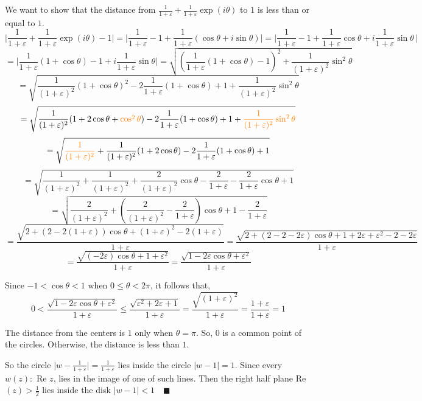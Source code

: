 \documentclass{article}
\begin{document}
We want to show that the distance from $\frac{1}{1+\varepsilon} + \frac{1}{1+\varepsilon} \exp
(i\theta)$ to $1$ is less than  or equal to $1$.
\[\bigg|\frac{1}{1+\varepsilon} + \frac{1}{1+\varepsilon} \exp
  (i\theta) -1 \bigg| = \bigg|\frac{1}{1+\varepsilon} -1 +
  \frac{1}{1+\varepsilon} (\cos \theta +i\sin \theta)\bigg| = \bigg|\frac{1}{1+\varepsilon} -1 +
  \frac{1}{1+\varepsilon} \cos \theta +i\frac{1}{1+\varepsilon} \sin
  \theta\,\bigg| \]
\[= \bigg|\frac{1}{1+\varepsilon}(1+\cos \theta) -1
  +i\frac{1}{1+\varepsilon} \sin \theta\bigg| = \sqrt{\left(\frac{1}{1+\varepsilon}(1+\cos \theta) -1\right)^2
  +\frac{1}{(1+\varepsilon)^2}\sin^2\theta}\]
\[= \sqrt{\frac{1}{(1+\varepsilon)^2}(1+\cos \theta)^2 -2\frac{1}{1+\varepsilon}(1+\cos \theta)+1
    +\frac{1}{(1+\varepsilon)^2}\sin^2\theta}\]
\[= \sqrt{\frac{1}{(1+\varepsilon)^2}(1+2\cos \theta + {\color{orange}
      \cos^2\theta}) -2\frac{1}{1+\varepsilon}(1+\cos \theta)+1
    +{\color{orange}\frac{1}{(1+\varepsilon)^2}\sin^2\theta}}\]
\[= \sqrt{{\color{orange}\frac{1}{(1+\varepsilon)^2}} + \frac{1}{(1+\varepsilon)^2}(1+2\cos \theta) -2\frac{1}{1+\varepsilon}(1+\cos \theta)+1}\]
\[= \sqrt{\frac{1}{(1+\varepsilon)^2} +
    \frac{1}{(1+\varepsilon)^2}+\frac{2}{(1+\varepsilon)^2}\cos \theta
    -\frac{2}{1+\varepsilon} -\frac{2}{1+\varepsilon}\cos \theta +1}\]
\[= \sqrt{\frac{2}{(1+\varepsilon)^2} +\left(\frac{2}{(1+\varepsilon)^2} -\frac{2}{1+\varepsilon}\right)\cos \theta
    +1-\frac{2}{1+\varepsilon}}\]
\[= \frac{\sqrt{2 +\left(2 -2(1+\varepsilon)\right)\cos \theta
    +(1+\varepsilon)^2-2(1+\varepsilon)}}{1+\varepsilon}= \frac{\sqrt{2 +\left(2 -2 -2\varepsilon\right)\cos \theta
    +1+2\varepsilon + \varepsilon^2-2-2\varepsilon}}{1+\varepsilon}\]
\[= \frac{\sqrt{\left(-2\varepsilon\right)\cos \theta
      +1+ \varepsilon^2}}{1+\varepsilon} = \frac{\sqrt{
      1 -2\varepsilon \cos \theta + \varepsilon^2 }}{1+\varepsilon}\]

Since $-1<\cos \theta < 1 $ when $0\leq \theta <2\pi$, it follows
that,\[ 0 < \frac{\sqrt{
       1 -2\varepsilon \cos \theta +\varepsilon^2 }}{1+\varepsilon}\leq \frac{\sqrt{
      \varepsilon^2 +2\varepsilon +1 }}{1+\varepsilon} =
  \frac{\sqrt{(1+\varepsilon)^2}}{1+\varepsilon} =
    \frac{1+\varepsilon}{1+\varepsilon} = 1\]

The distance from the centers is $1$ only when $\theta = \pi$. So, $0$ is a
common point of the circles. Otherwise, the distance is less than $1$.

So the circle $\big|w-\frac{1}{1+\varepsilon}|=\frac{1}{1+\varepsilon}$
lies inside the circle $|w-1|=1$. Since every $w(z):$ Re $z$, lies in the
image of one of such lines. Then the right half plane Re$(z) >\frac{1}{2}$ lies inside
the disk $|w-1|<1\quad \blacksquare$
\newpage
\end{document}
